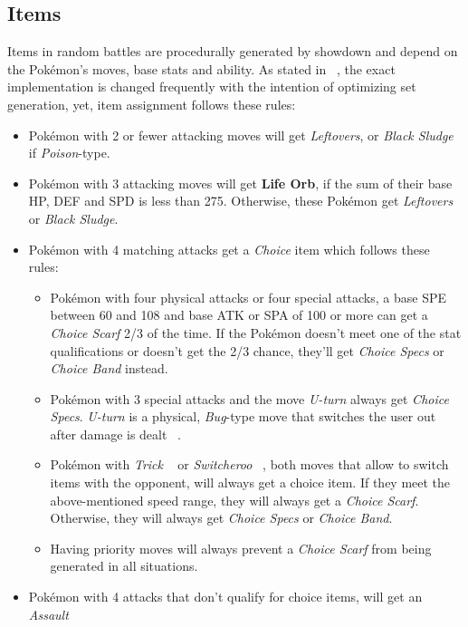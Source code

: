 \subsection{Items}
\label{sec:randbats-items}
Items in random battles are procedurally generated by showdown and depend on the Pokémon's
moves, base stats and ability. As stated in ~\autocite{Smogon:RandBatsGuide}, the exact implementation
is \grqq changed frequently with the intention of optimizing set generation\grqq, yet, item
assignment follows these rules:
\begin{itemize}
	\item Pokémon with 2 or fewer attacking moves will get \textit{Leftovers}, or 
	\textit{Black Sludge} if \textit{Poison}-type.
	\item Pokémon with 3 attacking moves will get \textbf{Life Orb}, if the sum of their base
	\ac{HP}, \ac{DEF} and \ac{SPD} is less than 275. Otherwise, these Pokémon get 
	\textit{Leftovers} or \textit{Black Sludge}.
	\item Pokémon with 4 matching attacks get a \textit{Choice} item which follows these rules:
	\begin{itemize}
		\item Pokémon with four physical attacks or four special attacks, a base \ac{SPE} between
		60 and 108 and base \ac{ATK} or \ac{SPA} of 100 or more can get a \textit{Choice Scarf}
		2/3 of the time. If the Pokémon doesn't meet one of the stat qualifications or doesn't
		get the 2/3 chance, they'll get \textit{Choice Specs} or \textit{Choice Band} instead.
		\item Pokémon with 3 special attacks and the move \textit{U-turn} always get 
		\textit{Choice Specs}. \textit{U-turn} is a physical, \textit{Bug}-type move that 
		switches the user out after damage is dealt ~\autocite{Bulbapedia:UTurn}.
		\item Pokémon with \textit{Trick} ~\autocite{Bulbapedia:Trick} or \textit{Switcheroo} 
		~\autocite{Bulbapedia:Switcheroo}, both moves that allow to switch items
		with the opponent, will always get a choice item. If they meet the above-mentioned 
		speed range, they will always get a \textit{Choice Scarf}. Otherwise, they will always
		get \textit{Choice Specs} or \textit{Choice Band}.
		\item Having priority moves will always prevent a \textit{Choice Scarf} from being 
		generated in all situations.
	\end{itemize}
	\item Pokémon with 4 attacks that don't qualify for choice items, will get an \textit{Assault
}
\end{itemize}
